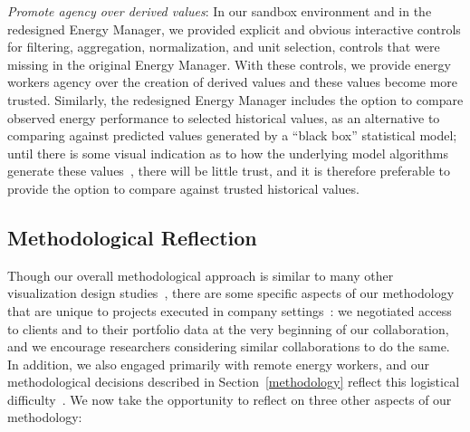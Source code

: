 \documentclass[journal]{vgtc}                %
\begin{document}
{\it Promote agency over derived values}: In our sandbox environment and in the redesigned Energy Manager, we provided explicit and obvious interactive controls for filtering, aggregation, normalization, and unit selection, controls that were missing in the original Energy Manager.
With these controls, we provide energy workers agency over the creation of derived values and these values become more trusted.
Similarly, the redesigned Energy Manager includes the option to compare observed energy performance to selected historical values, as an alternative to comparing against predicted values generated by a ``black box'' statistical model; until there is some visual indication as to how the underlying model algorithms generate these values~\cite{Muhlbacher2014}, there will be little trust, and it is therefore preferable to provide the option to compare against trusted historical values.


\subsection{Methodological Reflection}
\label{discussion-methodology}


Though our overall methodological approach is similar to many other visualization design studies~\cite{McKenna2014,Sedlmair2012}, there are some specific aspects of our methodology that are unique to projects executed in company settings~\cite{Sedlmair2011}: we negotiated access to clients and to their portfolio data at the very beginning of our collaboration, and we encourage researchers considering similar collaborations to do the same.
In addition, we also engaged primarily with remote energy workers, and our methodological decisions described in Section~\ref{methodology} reflect this logistical difficulty~\cite{Brehmer2014a}.
We now take the opportunity to reflect on three other aspects of our methodology:

    
\end{document}
